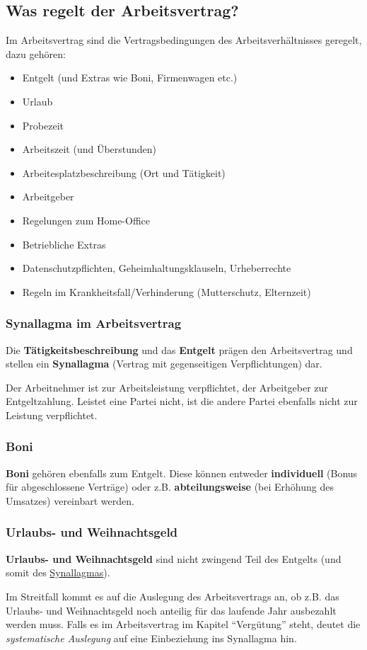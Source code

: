 \documentclass[12pt,A4]{extarticle}
\newcommand{\highlight}[1]{\textcolor{highlightColor}{\textbf{#1}}}
\begin{document}
\subsection{Was regelt der Arbeitsvertrag?}
Im Arbeitsvertrag sind die Vertragsbedingungen des Arbeitsverhältnisses geregelt, dazu gehören:
\begin{itemize}
  \item{Entgelt (und Extras wie Boni, Firmenwagen etc.)}
  \item{Urlaub}
  \item{Probezeit}
  \item{Arbeitszeit (und Überstunden)}
  \item{Arbeitesplatzbeschreibung (Ort und Tätigkeit)}
  \item{Arbeitgeber}
  \item{Regelungen zum Home-Office}
  \item{Betriebliche Extras}
  \item{Datenschutzpflichten, Geheimhaltungsklauseln, Urheberrechte}
  \item{Regeln im Krankheitsfall/Verhinderung (Mutterschutz, Elternzeit)}
\end{itemize}

\subsubsection{Synallagma im Arbeitsvertrag}\label{sec:arbeitsvertragSynallagma}
Die \textbf{Tätigkeitsbeschreibung} und das \textbf{Entgelt} prägen den Arbeitsvertrag und stellen ein \highlight{Synallagma} (Vertrag mit gegenseitigen Verpflichtungen) dar.\par
Der Arbeitnehmer ist zur Arbeitsleistung verpflichtet, der Arbeitgeber zur Entgeltzahlung. Leistet eine Partei nicht, ist die andere Partei ebenfalls nicht zur Leistung verpflichtet.

\subsubsection{Boni}
\textbf{Boni} gehören ebenfalls zum Entgelt. Diese können entweder \textbf{individuell} (Bonus für abgeschlossene Verträge) oder z.B. \textbf{abteilungsweise} (bei Erhöhung des Umsatzes) vereinbart werden.

\subsubsection{Urlaubs- und Weihnachtsgeld}
\textbf{Urlaubs- und Weihnachtsgeld} sind nicht zwingend Teil des Entgelts (und somit des \hyperref[sec:arbeitsvertragSynallagma]{Synallagmas}).\par
Im Streitfall kommt es auf die Auslegung des Arbeitsvertrags an, ob z.B. das Urlaubs- und Weihnachtsgeld noch anteilig für das laufende Jahr ausbezahlt werden muss. Falls es im Arbeitsvertrag im Kapitel ``Vergütung'' steht, deutet die \textit{systematische Auslegung} auf eine Einbeziehung ins Synallagma hin.
\end{document}
